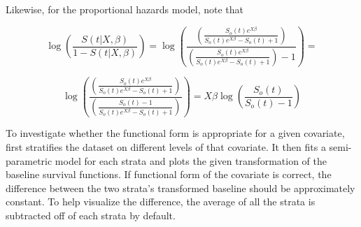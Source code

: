 \documentclass[article]{jss}
\begin{document}
Likewise, for the proportional hazards model, note that 

\[
\log \left( \frac{S(t | X, \beta) } { 1 - S(t | X, \beta) } \right) = \log \left(	\frac{\left(\frac{S_o(t) e^{X \beta} } {S_o(t) e^{X \beta} - S_o(t) + 1}	\right)}{\left (\frac{S_o(t) e^{X \beta} } {S_o(t) e^{X \beta} - S_o(t) + 1}	\right)-1}	\right) = 
\]

\[
\log \left(	\frac{\left(\frac{S_o(t) e^{X \beta} } {S_o(t) e^{X \beta} - S_o(t) + 1}	\right)}{\left (\frac{ S_o(t) - 1 } {S_o(t) e^{X \beta} - S_o(t) + 1}	\right)}	\right) 
= X \beta \log \left(\frac{ S_o(t) } { S_o(t) - 1 } \right)
\]

	To investigate whether the functional form is appropriate for a given covariate,  first stratifies the dataset on different levels of that covariate. It then fits a semi-parametric model for each strata and plots the given transformation of the baseline survival functions. If functional form of the covariate is correct, the difference between the two strata's transformed baseline should be approximately constant. To help visualize the difference, the average of all the strata is subtracted off of each strata by default. 
\end{document}
